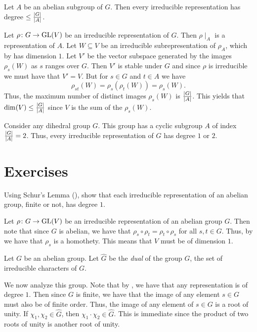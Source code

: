 \documentclass[letterpaper, 11pt, oneside]{book}
\begin{document}
\begin{cor}
  Let $A$ be an abelian subgroup of $G$.
  Then every irreducible representation has degree $\leq \frac{\abs{G}}{\abs{A}}$.
\end{cor}
\begin{pf}
  Let $\rho\colon G \to \operatorname{GL}(V)$ be an irreducible representation of $G$.
  Then $\rho\mid_{A}$ is a representation of $A$.
  Let $W \subseteq V$ be an irreducible subrepresentation of $\rho_{A}$, which by  has dimension $1$.
  Let $V'$ be the vector subspace generated by the images $\rho_{s}(W)$ as $s$ ranges over $G$.
  Then $V'$ is stable under $G$ and since $\rho$ is irreducible we must have that $V' = V$.
  But for $s \in G$ and $t \in A$ we have
  \[
    \rho_{st}(W) = \rho_{s}(\rho_{t}(W)) = \rho_{s}(W).
  \]
  Thus, the maximum number of distinct images $\rho_{s}(W)$ is $\frac{\abs{G}}{\abs{A}}$.
  This yields that $\dim(V) \leq \frac{\abs{G}}{\abs{A}}$ since $V$ is the sum of the $\rho_{s}(W)$.
\end{pf}

\begin{ex}
  Consider any dihedral group $G$.
  This group has a cyclic subgroup $A$ of index $\frac{\abs{G}}{\abs{A}} = 2$.
  Thus, every irreducible representation of $G$ has degree $1$ or $2$.
\end{ex}

\clearpage

\section*{Exercises}

\begin{exercise}
  Using Schur's Lemma (), show that each irreducible representation of an abelian group, finite or not, has degree $1$.
\end{exercise}
\begin{pf}
  Let $\rho\colon G \to \operatorname{GL}(V)$ be an irreducible representation of an abelian group $G$.
  Then note that since $G$ is abelian, we have that $\rho_{s} \circ \rho_{t} = \rho_{t} \circ \rho_{s}$ for all $s, t \in G$.
  Thus, by  we have that $\rho_{s}$ is a homothety.
  This means that $V$ must be of dimension $1$.
\end{pf}

\begin{defn}
  Let $G$ be an abelian group.
  Let $\widehat{G}$ be the \emph{dual} of the group $G$, the set of irreducible characters of $G$.

  We now analyze this group.
  Note that by , we have that any representation is of degree $1$.
  Then since $G$ is finite, we have that the image of any element $s \in G$ must also be of finite order.
  Thus, the image of any element of $s \in G$ is a root of unity.
  If $\chi_{1}, \chi_{2} \in \widehat{G}$, then $\chi_{1} \cdot \chi_{2} \in \widehat{G}$.
  This is immediate since the product of two roots of unity is another root of unity.
\end{defn}
\end{document}

